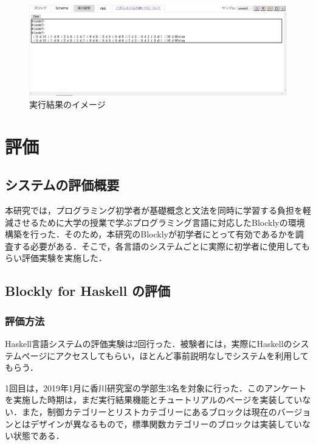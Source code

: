 \documentclass{risepaper}
\begin{document}
\begin{figure}[h]
\begin{center}
\includegraphics[scale=0.5]{img/execution_result.PNG}
\caption{実行結果のイメージ}%
\label{fig:excution_result}
\end{center}%
\end{figure}%

   \chapter{評価}
   
   \section{システムの評価概要}
   
本研究では，プログラミング初学者が基礎概念と文法を同時に学習する負担を軽減させるために大学の授業で学ぶプログラミング言語に対応したBlocklyの環境構築を行った．そのため，本研究のBlocklyが初学者にとって有効であるかを調査する必要がある．そこで，各言語のシステムごとに実際に初学者に使用してもらい評価実験を実施した．

   \section{Blockly for Haskell の評価}
   
   		\subsection{評価方法}
Haskell言語システムの評価実験は2回行った．被験者には，実際にHaskellのシステムページにアクセスしてもらい，ほとんど事前説明なしでシステムを利用してもらう．

1回目は，2019年1月に香川研究室の学部生3名を対象に行った．このアンケートを実施した時期は，まだ実行結果機能とチュートリアルのページを実装していない．また，制御カテゴリーとリストカテゴリーにあるブロックは現在のバージョンとはデザインが異なるもので，標準関数カテゴリーのブロックは実装していない状態である．
\end{document}

